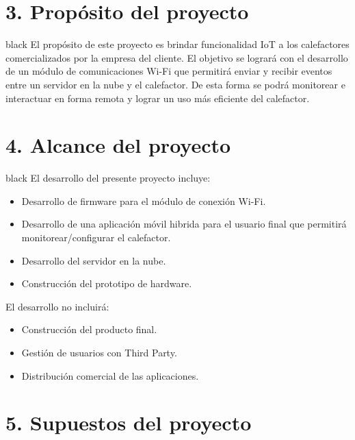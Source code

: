 \documentclass[
11pt, %
codirector, %
]{charter}
\begin{document}
\section{3. Propósito del proyecto}
\label{sec:proposito}

\begin{consigna}{black}
El propósito de este proyecto es brindar funcionalidad IoT a los calefactores comercializados por la empresa del cliente. El objetivo se logrará con el desarrollo de un módulo de comunicaciones Wi-Fi que permitirá enviar y recibir eventos entre un servidor en la nube y el calefactor. De esta forma se podrá monitorear e interactuar en forma remota y lograr un uso más eficiente del calefactor.
\end{consigna}

\section{4. Alcance del proyecto}
\label{sec:alcance}

\begin{consigna}{black}
El desarrollo del presente proyecto incluye:
\begin{itemize}

	\item Desarrollo de firmware para el módulo de conexión Wi-Fi.
	\item Desarrollo de una aplicación móvil hibrida para el usuario final que permitirá monitorear/configurar el calefactor.
	\item Desarrollo del servidor en la nube.
	\item Construcción del prototipo de hardware.
\end{itemize}	
El desarrollo no incluirá:
\begin{itemize}
	\item Construcción del producto final.
	\item Gestión de usuarios con Third Party.
	\item Distribución comercial de las aplicaciones.
\end{itemize}
\end{consigna}


\section{5. Supuestos del proyecto}
\label{sec:supuestos}
\end{document}
